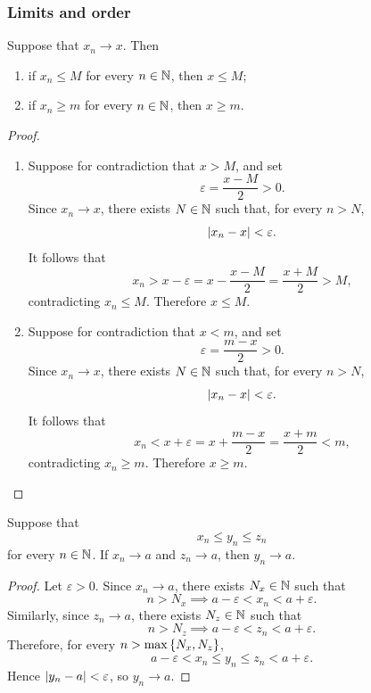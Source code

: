 \documentclass[11pt,a4paper]{amsart}
\begin{document}
\subsubsection{Limits and order}

\begin{theorem}
  Suppose that \(x_n\to x\). Then
  \begin{enumerate}
    \item if \(x_n\leq M\) for every \(n\in\mathbb{N}\), then \(x\leq M\);
    \item if \(x_n\geq m\) for every \(n\in\mathbb{N}\), then \(x\geq m\).
  \end{enumerate}
\end{theorem}

\begin{proof}
  \begin{enumerate}
    \item
      Suppose for contradiction that \(x>M\), and set
      \[
        \varepsilon=\frac{x-M}{2}>0.
      \]
      Since \(x_n\to x\), there exists \(N\in\mathbb{N}\) such that, for every
      \(n>N\),
      \[
        \lvert x_n-x\rvert<\varepsilon.
      \]
      It follows that
      \[
        x_n>x-\varepsilon
        =x-\frac{x-M}{2}
        =\frac{x+M}{2}
        >M,
      \]
      contradicting \(x_n\leq M\). Therefore \(x\leq M\).

    \item
      Suppose for contradiction that \(x<m\), and set
      \[
        \varepsilon=\frac{m-x}{2}>0.
      \]
      Since \(x_n\to x\), there exists \(N\in\mathbb{N}\) such that, for every
      \(n>N\),
      \[
        \lvert x_n-x\rvert<\varepsilon.
      \]
      It follows that
      \[
        x_n<x+\varepsilon
        =x+\frac{m-x}{2}
        =\frac{x+m}{2}
        <m,
      \]
      contradicting \(x_n\geq m\). Therefore \(x\geq m\).
  \end{enumerate}
\end{proof}

\begin{theorem}
  Suppose that
  \[
    x_n\leq y_n\leq z_n
  \]
  for every \(n\in\mathbb{N}\). If \(x_n\to a\) and \(z_n\to a\), then
  \(y_n\to a\).
\end{theorem}

\begin{proof}
  Let \(\varepsilon>0\). Since \(x_n\to a\), there exists \(N_x\in\mathbb{N}\) such
  that
  \[
    n>N_x\implies a-\varepsilon<x_n<a+\varepsilon.
  \]
  Similarly, since \(z_n\to a\), there exists \(N_z\in\mathbb{N}\) such that
  \[
    n>N_z\implies a-\varepsilon<z_n<a+\varepsilon.
  \]
  Therefore, for every \(n>\max\left\lbrace N_x,N_z\right\rbrace\),
  \[
    a-\varepsilon<x_n\leq y_n\leq z_n<a+\varepsilon.
  \]
  Hence \(\lvert y_n-a\rvert<\varepsilon\), so \(y_n\to a\).
\end{proof}
\end{document}
